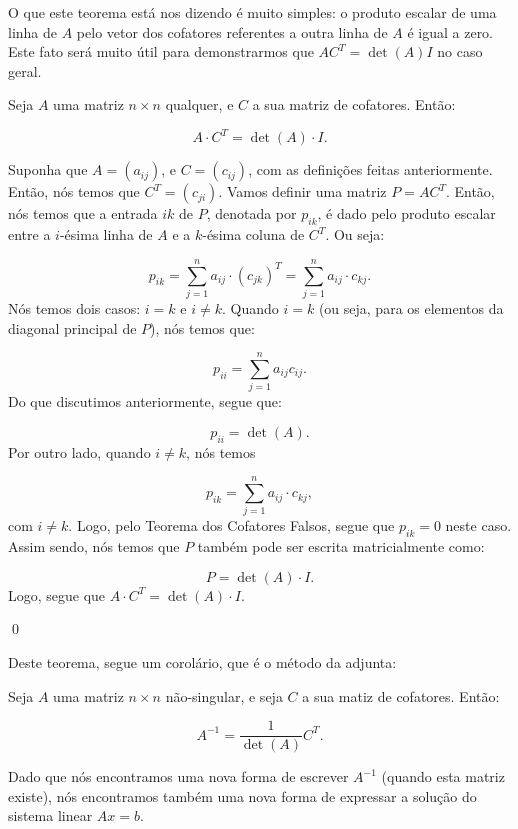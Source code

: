 O que este teorema está nos dizendo é muito simples: o produto escalar de uma linha de $A$ pelo vetor dos cofatores referentes a outra linha de $A$ é igual a zero. Este fato será muito útil para demonstrarmos que $AC^T = \det(A)I$ no caso geral.

\begin{Theorem}
	Seja $A$ uma matriz $n\times n$ qualquer, e $C$ a sua matriz de cofatores. Então:
	
	$$
	A\cdot C^T = \det(A)\cdot I.
	$$
\end{Theorem}

\begin{Proof}
	Suponha que $A = (a_{ij})$, e $C = (c_{ij})$, com as definições feitas anteriormente. Então, nós temos que $C^T = (c_{ji})$. Vamos definir uma matriz $P = AC^T$. Então, nós temos que a entrada $ik$ de $P$, denotada por $p_{ik}$, é dado pelo produto escalar entre a $i$-ésima linha de $A$ e a $k$-ésima coluna de $C^T$. Ou seja:
	
	$$
	p_{ik} = \sum\limits_{j = 1}^{n} a_{ij}\cdot (c_{jk})^T = \sum\limits_{j = 1}^{n} a_{ij}\cdot c_{kj}.
	$$
	Nós temos dois casos: $i = k$ e $i\neq k$. Quando $i = k$ (ou seja, para os elementos da diagonal principal de $P$), nós temos que:
	
	$$
	p_{ii} = \sum\limits_{j = 1}^{n} a_{ij}c_{ij}.
	$$
	Do que discutimos anteriormente, segue que:
	
	$$
	p_{ii} = \det(A).
	$$
	Por outro lado, quando $i\neq k$, nós temos
	
	$$
	p_{ik} = \sum\limits_{j = 1}^{n} a_{ij}\cdot c_{kj},
	$$
	com $i\neq k$. Logo, pelo Teorema dos Cofatores Falsos, segue que $p_{ik} = 0$ neste caso. Assim sendo, nós temos que $P$ também pode ser escrita matricialmente como:
	
	$$
	P = \det(A)\cdot I.
	$$
	Logo, segue que $A\cdot C^T = \det(A)\cdot I$.
	
	\qed
\end{Proof}

Deste teorema, segue um corolário, que é o método da adjunta:

\begin{Corolary}
	Seja $A$ uma matriz $n\times n$ não-singular, e seja $C$ a sua matiz de cofatores. Então:
	
	$$
	A^{-1} = \dfrac{1}{\det(A)}C^T.
	$$
\end{Corolary}

Dado que nós encontramos uma nova forma de escrever $A^{-1}$ (quando esta matriz existe), nós encontramos também uma nova forma de expressar a solução do sistema linear $Ax = b$.


